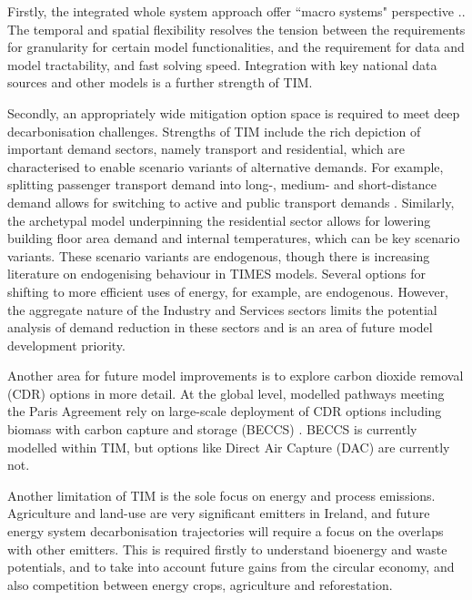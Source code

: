 \documentclass[gmd,manuscript]{copernicus}
\begin{document}
Firstly, the integrated whole system approach offer ``macro systems" perspective .. The temporal and spatial flexibility resolves the tension between the requirements for granularity for certain model functionalities, and the requirement for data and model tractability, and fast solving speed. Integration with key national data sources and other models is a further strength of TIM. 

Secondly, an appropriately wide mitigation option space is required to meet deep decarbonisation challenges. Strengths of TIM include the rich depiction of important demand sectors, namely transport and residential, which are characterised to enable scenario variants of alternative demands. For example, splitting passenger transport demand into long-, medium- and short-distance demand allows for switching to active and public transport demands . Similarly, the archetypal model underpinning the residential sector allows for lowering building floor area demand and internal temperatures, which can be key scenario variants. These scenario variants are endogenous, though there is increasing literature on endogenising behaviour in TIMES models. Several options for shifting to more efficient uses of energy, for example, are endogenous. However, the aggregate nature of the Industry and Services sectors limits the potential analysis of demand reduction in these sectors and is an area of future model development priority.

Another area for future model improvements is to explore carbon dioxide removal (CDR) options in more detail. At the global level, modelled pathways meeting the Paris Agreement rely on large-scale deployment of CDR options including biomass with carbon capture and storage (BECCS) \citep{IPCC2018}. BECCS is currently modelled within TIM, but options like Direct Air Capture (DAC)\citep{Realmonte2019} are currently not.

Another limitation of TIM is the sole focus on energy and process emissions. Agriculture and land-use are very significant emitters in Ireland, and future energy system decarbonisation trajectories will require a focus on the overlaps with other emitters. This is required firstly to understand bioenergy and waste potentials, and to take into account future gains from the circular economy, and also competition between energy crops, agriculture and reforestation.
\end{document}
